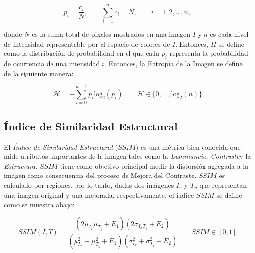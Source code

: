 \begin{equation}
p_i=\frac{c_i}{N}, \qquad \sum_{i=1}^n c_i = N, \qquad i= 1,2, ..., n,
\end{equation}

donde $N$ es la suma total de pixeles mostrados en una imagen $I$ y $n$ es cada nivel de intensidad representable por el espacio de colores de $I$. Entonces, $H$ se define como la distribución de probabilidad en el que cada $p_i$ representa la probabilidad de ocurrencia de una intensidad $i$. Entonces, la Entropía de la Imagen se define de la siguiente manera:


\begin{equation}
\mathscr{H}= -\sum_{i=0}^{n-1} p_i \text{log}_2(p_i) \qquad \mathscr{H} \in \{0,...,\text{log}_2(n)\}
\end{equation}

\subsection{Índice de Similaridad Estructural}

El \textit{Índice de Similaridad Estructural} ($SSIM$) \cite{wang2004image} es una métrica bien conocida que mide atributos importantes de la imagen tales como la \textit{Luminancia, Contraste}y la \textit{Estructura}. $SSIM$ tiene como objetivo principal medir la distorsión agregada a la imagen como consecuencia del proceso de Mejora del Contraste. $SSIM$ es calculado por regiones, por lo tanto, dadas dos imágenes $I_x$ y $T_y$ que representan una imagen original y una mejorada, respectivamente, el índice $SSIM$ se define como se muestra abajo: 


\begin{equation}
SSIM(I,T) = \frac{(2\mu_{I_x} \mu_{T_y}+E_1)(2\sigma_{I_xT_y}+E_2)}{(\mu^2_{I_x}+\mu^2_{T_y}+E_1)(\sigma^2_{I_x} + \sigma^2_{T_y}+E_2)} \qquad SSIM \in [0,1]
\end{equation}

